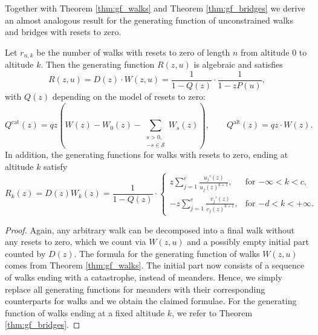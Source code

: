 Together with Theorem \ref{thm:gf_walks} and Theorem \ref{thm:gf_bridges} we derive an almost analogous result for the generating function of unconstrained walks and bridges with resets to zero.

\begin{theorem}
\label{thm:gf_walks_bridges_catastrophes}
  Let $r_{n,k}$ be the number of walks with resets to zero of length $n$ from altitude $0$ to altitude $k$. Then the generating function $R(z,u)$ is algebraic and satisfies
  \begin{equation*}
    R(z,u) = D(z) \cdot W(z,u) = \frac{1}{1 - Q(z)} \cdot \frac{1}{1 - zP(u)},
  \end{equation*}
  with $Q(z)$ depending on the model of resets to zero:
  \begin{equation*}
    Q^\mathrm{cat}(z) = q z \left(W(z) - W_0(z) - \sum_{\substack{s > 0, \\ -s\in \mathcal{S}}} W_s(z)\right), \qquad
    Q^\mathrm{alt}(z) = q z \cdot W(z).
  \end{equation*}
  In addition, the generating functions for walks with resets to zero, ending at altitude $k$ satisfy
  \begin{equation*}
    R_k(z) = D(z)W_k(z) = \frac{1}{1 - Q(z)} \cdot
    \begin{cases}
      z\sum_{j=1}^c \frac{u_j'(z)}{u_j(z)^{k+1}}, & \text{for $-\infty < k < c$}, \\[5pt]
      -z\sum_{j=1}^c \frac{v_j'(z)}{v_j(z)^{k+1}}, & \text{for $-d < k < +\infty$}.
    \end{cases}
  \end{equation*}
\end{theorem}

\begin{proof}
  Again, any arbitrary walk can be decomposed into a final walk without any resets to zero, which we count via $W(z,u)$ and a possibly empty initial part counted by $D(z)$. The formula for the generating function of walks $W(z,u)$ comes from Theorem \ref{thm:gf_walks}.
  The initial part now consists of a sequence of walks ending with a catastrophe, instead of meanders.
  Hence, we simply replace all generating functions for meanders with their corresponding counterparts for walks and we obtain the claimed formulae.
  For the generating function of walks ending at a fixed altitude $k$, we refer to Theorem \ref{thm:gf_bridges}.
\end{proof}


